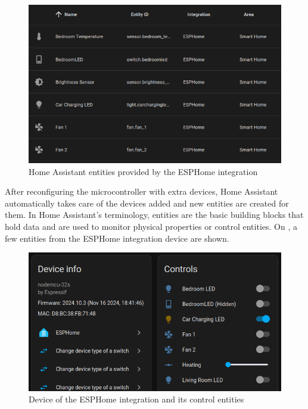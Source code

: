 \begin{figure}[!ht]
  \centering
  \includegraphics[width=150mm, keepaspectratio]{figures/esphome_entities.png}
  \caption{Home Assistant entities provided by the ESPHome integration}
  \label{fig:HAesphomeEntities}
\end{figure}

After reconfiguring the microcontroller with extra devices, Home Assistant automatically takes care of the devices added and new entities are created for them. In Home Assistant's terminology, entities are the basic building blocks that hold data and are used to monitor physical properties or control entities. \cite{HAConceptsTerminology} On , a few entities from the ESPHome integration device are shown. 

\begin{figure}[!ht]
  \centering
  \includegraphics[width=150mm, keepaspectratio]{figures/esphome_controls.png}
  \caption{Device of the ESPHome integration and its control entities}
  \label{fig:HAesphomeControls}
\end{figure}

